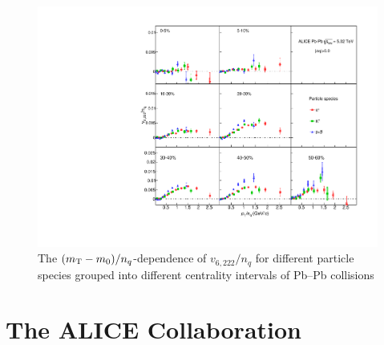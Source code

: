 \documentclass[ALICE,manyauthors]{cernphprep}
\providecommand{\DIFaddbeginFL}{} %
\providecommand{\DIFaddendFL}{} %
\providecommand{\DIFdelbeginFL}{} %
\providecommand{\DIFdelendFL}{} %
\begin{document}
\begin{figure}[htb]
\begin{center}
\DIFdelbeginFL %
\DIFdelendFL %
\DIFaddbeginFL \includegraphics[scale=0.82]{figures/scaling/All_v6222_gap00_KET_3by3.pdf}

\DIFaddendFL \end{center}
\caption{The $(m_{\rm{T}} - m_{0})/n_{q}$-dependence of $v_{6,222}/n_{q}$ for different particle species grouped into different centrality intervals of Pb--Pb collisions \sNN}
\label{v6222_KET}
\end{figure}

%
%

\section{The ALICE Collaboration}
\label{app:collab}
%  
\end{document}
